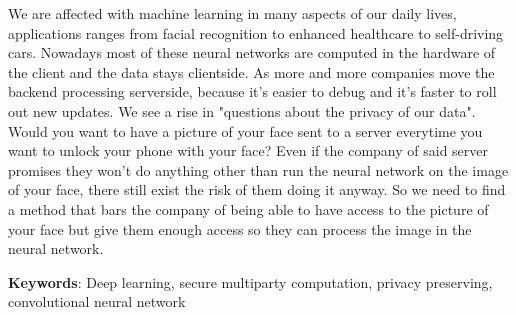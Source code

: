 We are affected with machine learning in many aspects of our daily lives, applications ranges from facial recognition to enhanced healthcare to self-driving cars. Nowadays most of these neural networks are computed in the hardware of the client and the data stays clientside. As more and more companies move the backend processing serverside, because it's easier to debug and it's faster to roll out new updates. We see a rise in "questions about the privacy of our data". Would you want to have a picture of your face sent to a server everytime you want to unlock your phone with your face? Even if the company of said server promises they won't do anything other than run the neural network on the image of your face, there still exist the risk of them doing it anyway. So we need to find a method that bars the company of being able to have access to the picture of your face but give them enough access so they can process the image in the neural network.

\textbf{Keywords}: Deep learning, secure multiparty computation, privacy preserving, convolutional neural network
